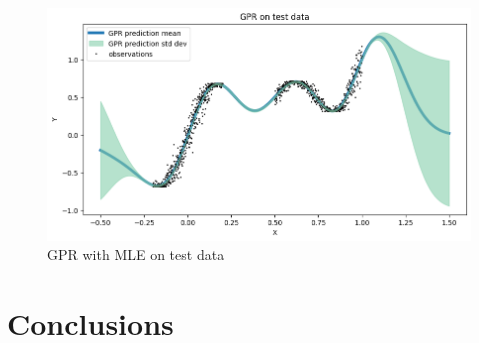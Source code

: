 \documentclass[11pt,a4paper]{article}
\begin{document}
\begin{figure}[h!]
    \centering
    \includegraphics[scale=0.5]{gpr test.png}
    \caption{GPR with MLE on test data}
    \label{fig:gpr mle test}
\end{figure}

\section{Conclusions}
\end{document}
